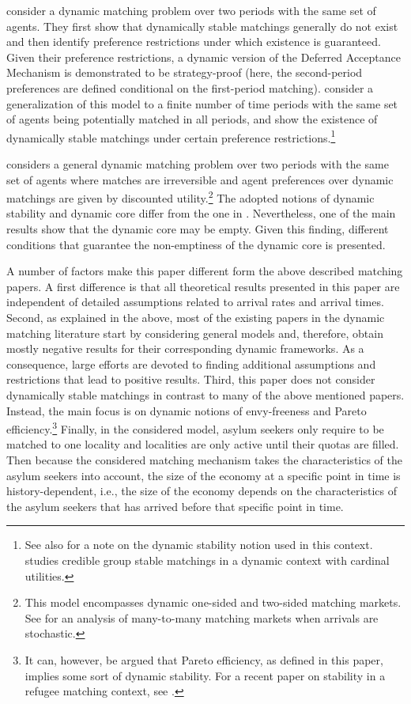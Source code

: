 \documentclass[12pt,fleqn]{article}
\begin{document}
\citet{bib:KadamEtAl2018a} consider a dynamic matching problem over two periods with the same set of agents. They first show that dynamically stable matchings generally do not exist and then identify preference restrictions under which existence is guaranteed. Given their preference restrictions, a dynamic version of the Deferred Acceptance Mechanism is demonstrated to be strategy-proof (here, the second-period preferences are defined conditional on the first-period matching). \citet{bib:KadamEtAl2018b} consider a generalization of this model to a finite number of time periods with the same set of agents being potentially matched in all periods, and show the existence of dynamically stable matchings under certain preference restrictions.\footnote{See also \citet{bib:Kotowski} for a note on the dynamic stability notion used in this context. \citet{bib:Kurino} studies credible group stable matchings in a dynamic context with cardinal utilities.}

\citet{bib:Doval2017} considers a general dynamic matching problem over two periods with the same set of agents where matches are irreversible and agent preferences over dynamic matchings are given by discounted utility.\footnote{This model encompasses dynamic one-sided and two-sided matching markets. See \citet{bib:Doval2016} for an analysis of many-to-many matching markets when arrivals are stochastic.} The adopted notions of dynamic stability and dynamic core differ from the one in \citet{bib:KadamEtAl2018a,bib:KadamEtAl2018b}. Nevertheless, one of the main results show that the dynamic core may be empty. Given this finding, different conditions that guarantee the non-emptiness of the dynamic core is presented.

A number of factors make this paper different form the above described matching papers. A first difference is that all theoretical results presented in this paper are independent of detailed assumptions related to arrival rates and arrival times. Second, as explained in the above, most of the existing papers in the dynamic matching literature start by considering general models and, therefore, obtain mostly negative results for their corresponding dynamic frameworks. As a consequence, large efforts are devoted to finding additional assumptions and restrictions that lead to positive results. Third, this paper does not consider dynamically stable matchings in contrast to many of the above mentioned papers. Instead, the main focus is on dynamic notions of envy-freeness and Pareto efficiency.\footnote{It can, however, be argued that Pareto efficiency, as defined in this paper, implies some sort of dynamic stability. For a recent paper on stability in a refugee matching context, see \citet{bib:AzizEtAl2017}.} Finally, in the considered model, asylum seekers only require to be matched to one locality and localities are only active until their quotas are filled. Then because the considered matching mechanism takes the characteristics of the asylum seekers into account, the size of the economy at a specific point in time is history-dependent, i.e., the size of the economy depends on the characteristics of the asylum seekers that has arrived before that specific point in time.
\end{document}

